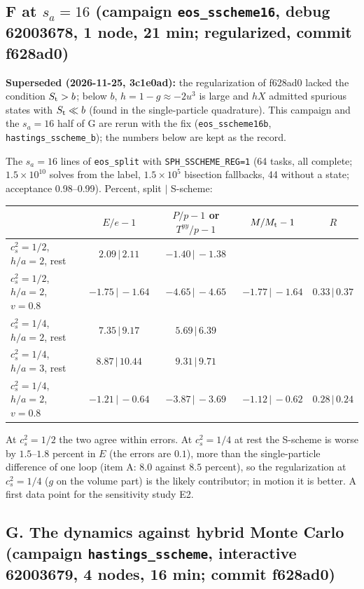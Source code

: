 \documentclass[11pt,aps,preprint,nofootinbib,superscriptaddress,tightenlines]{revtex4-2}
\begin{document}
\subsection*{F at $s_a=16$ (campaign \texttt{eos\_sscheme16}, debug 62003678, 1 node, 21 min; regularized, commit f628ad0)}
\textbf{Superseded (2026-11-25, 3c1e0ad):} the regularization of f628ad0 lacked the condition $S_{\rm t}>b$; below $b$, $h=1-g\approx-2u^3$ is large and $hX$
admitted spurious states with $S_{\rm t}\ll b$ (found in the single-particle quadrature).  This campaign and the $s_a=16$ half of G are rerun with the
fix (\texttt{eos\_sscheme16b}, \texttt{hastings\_sscheme\_b}); the numbers below are kept as the record.

The $s_a=16$ lines of \texttt{eos\_split} with \texttt{SPH\_SSCHEME\_REG=1} (64 tasks, all complete; $1.5\times10^{10}$ solves from the label,
$1.5\times10^5$ bisection fallbacks, 44 without a state; acceptance 0.98--0.99).  Percent, split $|$ S-scheme:
\begin{center}\small
\begin{tabular}{lcccc}
\toprule
 & $E/e-1$ & $P/p-1$ or $T^{yy}/p-1$ & $M/M_{\rm t}-1$ & $R$ \\
\midrule
$c_s^2=1/2$, $h/a=2$, rest & $2.09\,|\,2.11$ & $-1.40\,|\,-1.38$ & & \\
$c_s^2=1/2$, $h/a=2$, $v=0.8$ & $-1.75\,|\,-1.64$ & $-4.65\,|\,-4.65$ & $-1.77\,|\,-1.64$ & $0.33\,|\,0.37$ \\
$c_s^2=1/4$, $h/a=2$, rest & $7.35\,|\,9.17$ & $5.69\,|\,6.39$ & & \\
$c_s^2=1/4$, $h/a=3$, rest & $8.87\,|\,10.44$ & $9.31\,|\,9.71$ & & \\
$c_s^2=1/4$, $h/a=2$, $v=0.8$ & $-1.21\,|\,-0.64$ & $-3.87\,|\,-3.69$ & $-1.12\,|\,-0.62$ & $0.28\,|\,0.24$ \\
\bottomrule
\end{tabular}
\end{center}
At $c_s^2=1/2$ the two agree within errors.  At $c_s^2=1/4$ at rest the S-scheme is worse by $1.5$--$1.8$ percent in $E$ (the errors are $0.1$), more
than the single-particle difference of one loop (item A: $8.0$ against $8.5$ percent), so the regularization at $c_s^2=1/4$ ($g$ on the volume part) is
the likely contributor; in motion it is better.  A first data point for the sensitivity study E2.

\subsection*{G. The dynamics against hybrid Monte Carlo (campaign \texttt{hastings\_sscheme}, interactive 62003679, 4 nodes, 16 min; commit f628ad0)}
\end{document}
